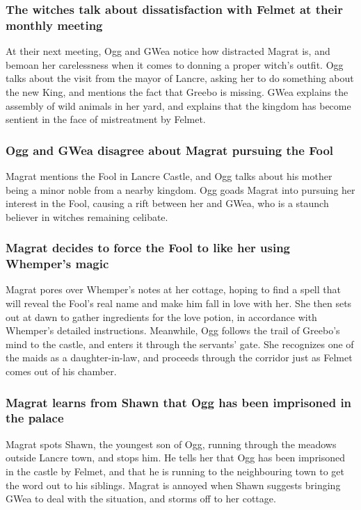 \subsubsection{The witches talk about dissatisfaction with \Gls{Felmet} at their monthly meeting}
At their next meeting, \Gls{Ogg} and \Gls{GWea} notice how distracted \Gls{Magrat} is, and bemoan
her carelessness when it comes to donning a proper witch's outfit. \Gls{Ogg} talks about the visit
from the mayor of Lancre, asking her to do something about the new King, and mentions the fact that
\Gls{Greebo} is missing. \Gls{GWea} explains the assembly of wild animals in her yard, and explains
that the kingdom has become sentient in the face of mistreatment by \Gls{Felmet}.

\subsubsection{\Gls{Ogg} and \Gls{GWea} disagree about \Gls{Magrat} pursuing the \Gls{Fool}}
\Gls{Magrat} mentions the \Gls{Fool} in Lancre Castle, and \Gls{Ogg} talks about his mother being
a minor noble from a nearby kingdom. \Gls{Ogg} goads \Gls{Magrat} into pursuing her interest in the
\Gls{Fool}, causing a rift between her and \Gls{GWea}, who is a staunch believer in witches
remaining celibate.

\subsubsection{\Gls{Magrat} decides to force the \Gls{Fool} to like her using \Gls{Whemper}'s magic}
\Gls{Magrat} pores over \Gls{Whemper}'s notes at her cottage, hoping to find a spell that will
reveal the \Gls{Fool}'s real name and make him fall in love with her. She then sets out at dawn to
gather ingredients for the love potion, in accordance with \Gls{Whemper}'s detailed instructions.
Meanwhile, \Gls{Ogg} follows the trail of \Gls{Greebo}'s mind to the castle, and enters it through
the servants' gate. She recognizes one of the maids as a daughter-in-law, and proceeds through the
corridor just as \Gls{Felmet} comes out of his chamber.

\subsubsection{\Gls{Magrat} learns from \Gls{Shawn} that \Gls{Ogg} has been imprisoned in the
    palace}
\Gls{Magrat} spots \Gls{Shawn}, the youngest son of \Gls{Ogg}, running through the meadows outside
Lancre town, and stops him. He tells her that \Gls{Ogg} has been imprisoned in the castle by
\Gls{Felmet}, and that he is running to the neighbouring town to get the word out to his siblings.
\Gls{Magrat} is annoyed when \Gls{Shawn} suggests bringing \Gls{GWea} to deal with the situation,
and storms off to her cottage.

